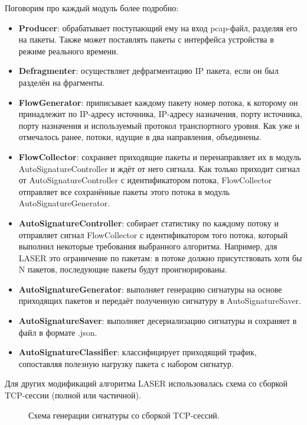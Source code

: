 Поговорим про каждый модуль более подробно:

\begin{itemize}
    \item \textbf{Producer}: обрабатывает поступающий ему на вход pcap-файл, разделяя его на пакеты.
    Также может поставлять пакеты с интерфейса устройства в режиме реального времени.
    \item \textbf{Defragmenter}: осуществляет дефрагментацию IP пакета, если он был разделён на фрагменты.
    \item \textbf{FlowGenerator}: приписывает каждому пакету номер потока, к которому он принадлежит по
    IP-адресу источника, IP-адресу назначения, порту источника, порту назначения и используемый протокол транспортного уровня.
    Как уже и отмечалось ранее, потоки, идущие в два направления, объединены.
    \item \textbf{FlowCollector}: сохраняет приходящие пакеты и перенаправляет их в модуль \\ AutoSignatureController и ждёт от него сигнала.
    Как только приходит сигнал от AutoSignatureController с идентификатором потока, FlowCollector отправляет все сохранённые пакеты этого потока в модуль AutoSignatureGenerator.
    \item \textbf{AutoSignatureController}: собирает статистику по каждому потоку и отправляет сигнал FlowCollector с идентификатором того потока,
    который выполнил некоторые требования выбранного алгоритма.
    Например, для LASER это ограничение по пакетам: в потоке должно присутствовать хотя бы N пакетов, последующие пакеты будут проигнорированы.
    \item \textbf{AutoSignatureGenerator}: выполняет генерацию сигнатуры на основе приходящих пакетов и передаёт полученную сигнатуру в AutoSignatureSaver.
    \item \textbf{AutoSignatureSaver}: выполняет десериализацию сигнатуры и сохраняет в файл в формате .json.
    \item \textbf{AutoSignatureClassifier}: классифицирует приходящий трафик, сопоставляя полезную нагрузку пакета с набором сигнатур.
\end{itemize}

Для других модификаций алгоритма LASER использовалась схема со сборкой TCP-сессии (полной или частичной).

\begin{figure}[H]
    \begin{center}
        
        \caption{Схема генерации сигнатуры со сборкой TCP-сессий.}
    \end{center}
\end{figure}

